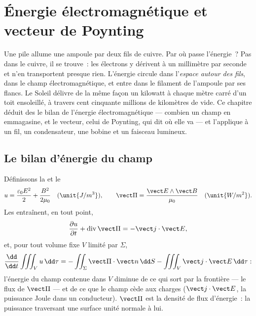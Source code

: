 \chapter{Énergie électromagnétique et vecteur de Poynting}\label{ch:b2:poynting-vector}

Une pile allume une ampoule par deux fils de cuivre. Par où passe
l'énergie~? Pas dans le cuivre, il se trouve~: les électrons y
dérivent à un millimètre par seconde et n'en transportent presque rien. L'énergie
circule dans l'\emph{espace autour des fils}, dans le champ
électromagnétique, et entre dans le filament de l'ampoule par ses
flancs. Le Soleil délivre de la même façon un kilowatt à chaque mètre carré d'un
toit ensoleillé, à travers cent cinquante millions de kilomètres de
vide. Ce chapitre déduit des  le bilan
de l'énergie électromagnétique --- combien un champ en emmagasine, et
le vecteur, celui de Poynting, qui dit où elle va --- et l'applique à un
fil, un condensateur, une bobine et un faisceau lumineux.

\section{Le bilan d'énergie du champ}

\begin{theorem}\label{thm:b2:poynting-vector:poynting}
Définissons la \emph{} et le \emph{}
\[
u = \frac{\varepsilon_0E^2}2 + \frac{B^2}{2\mu_0} \quad (\unit{J/m^3}) , \qquad
\vect\Pi = \frac{\vect E\wedge\vect B}{\mu_0} \quad (\unit{W/m^2}) .
\]
Les  entraînent, en tout point,
\[
\frac{\partial u}{\partial t} + \operatorname{div}\vect\Pi = -\vect j\cdot\vect E ,
\]
et, pour tout volume fixe $V$ limité par $\Sigma$,
\[
\frac{\dd}{\dd t}\iiint_Vu\,\dd\tau = -\iint_\Sigma\vect\Pi\cdot\vect n\,\dd S - \iiint_V\vect j\cdot\vect E\,\dd\tau :
\]
l'énergie du champ contenue dans $V$ diminue de ce qui sort par la
frontière --- le flux de $\vect\Pi$ --- et de ce que le champ cède aux
charges ($\vect j\cdot\vect E$, la puissance Joule dans un conducteur). $\vect\Pi$
est la densité de flux d'énergie~: la puissance traversant une surface unité normale
à lui.
\end{theorem}

